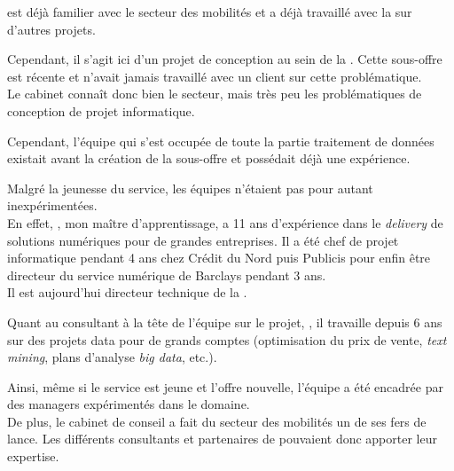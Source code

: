 \tnp est déjà familier avec le secteur des mobilités et a déjà travaillé avec la \sncf sur d'autres projets.

Cependant, il s'agit ici d'un projet de conception au sein de la \df. Cette sous-offre est récente et \tnp n'avait jamais travaillé avec un client sur cette problématique.\\
Le cabinet connaît donc bien le secteur, mais très peu les problématiques de conception de projet informatique.

Cependant, l'équipe \ds qui s'est occupée de toute la partie traitement de données existait avant la création de la sous-offre et possédait déjà une expérience.

Malgré la jeunesse du service, les équipes n'étaient pas pour autant inexpérimentées.\\
En effet, \damien, mon maître d'apprentissage, a 11 ans d’expérience dans le \emph{delivery} de solutions numériques pour de grandes entreprises. Il a été chef de projet informatique pendant 4 ans chez Crédit du Nord puis Publicis pour enfin être directeur du service numérique de Barclays pendant 3 ans.\\
Il est aujourd'hui directeur technique de la \df.

Quant au consultant à la tête de l'équipe \emph{\ds} sur le projet, \artem, il travaille depuis 6 ans sur des projets data pour de grands comptes (optimisation du prix de vente, \textit{text mining}, plans d'analyse \textit{big data}, etc.).

Ainsi, même si le service est jeune et l'offre nouvelle, l'équipe a été encadrée par des managers expérimentés dans le domaine.\\
De plus, le cabinet de conseil a fait du secteur des mobilités un de ses fers de lance. Les différents consultants et partenaires de \tnp pouvaient donc apporter leur expertise.
